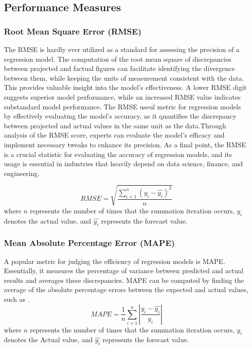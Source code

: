 \documentclass[a4paper, fleqn]{cas-sc}
\theoremstyle{definition}
\theoremstyle{remark}
\begin{document}
\subsection{ Performance Measures}
\subsubsection{Root Mean Square Error (RMSE) }
The RMSE is hardly ever utilized as a standard for assessing the precision of a regression model. The computation of the root mean square of discrepancies between projected and factual figures can facilitate identifying the divergence between them,  while keeping the units of measurement consistent with the data. This provides valuable insight into the model's effectiveness. A lower RMSE digit suggests superior model performance,  while an increased RMSE value indicates substandard model performance. The RMSE  useul metric for regression models by effectively evaluating the model's accuracy,  as it quantifies the discrepancy between projected and actual values in the same unit as the data.Through analysis of the RMSE score,  experts can evaluate the model's efficacy and implement necessary tweaks to enhance its precision. As a final point,  the RMSE is a crucial statistic for evaluating the accuracy of regression models,  and its usage is essential in industries that heavily depend on data science,  finance,  and engineering.



\begin{equation} \label{rmsee}
RMSE=\sqrt{\frac{\sum_{i=1}^{n}(y_{i}-\hat{y_{i}})^2}{n}}
\end{equation}
where $n$ represents the number of times that the summation iteration occurs,  \begin{math} y_{i} \end{math} denotes the actual value,  and \begin{math}\hat{y_{i}}\end{math} represents the forecast value.




\subsubsection{ Mean Absolute Percentage Error (MAPE)}
A popular metric for judging the efficiency of regression models is MAPE. Essentially,  it measures the percentage of variance between predicted and actual results and averages these discrepancies. MAPE can be computed by finding the average of the absolute percentage errors between the expected and actual values,  such as .
\begin{equation} \label{mapee}
MAPE=\frac{1}{n}\sum_{i=1}^{n} \left | \frac{y_{i}-\hat{y_{i}}}{y_{i}} \right |
\end{equation}
where $n$ represents the number of times that the summation iteration occurs,  \begin{math} y_{i} \end{math} denotes the Actual value,  and \begin{math}\hat{y_{i}}\end{math} represents the forecast value.
\end{document}
